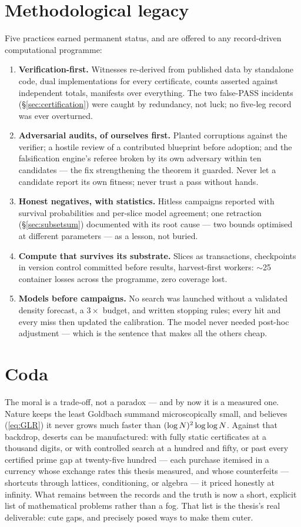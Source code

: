 \section{Methodological legacy}\label{sec:method}

Five practices earned permanent status, and are offered to any
record-driven computational programme:

\begin{enumerate}
\item \textbf{Verification-first.} Witnesses re-derived from published
data by standalone code, dual implementations for every certificate,
counts asserted against independent totals, manifests over everything.
The two false-PASS incidents (\S\ref{sec:certification}) were caught
by redundancy, not luck; no five-leg record was ever overturned.
\item \textbf{Adversarial audits, of ourselves first.} Planted
corruptions against the verifier; a hostile review of a contributed
blueprint before adoption; and the falsification engine's referee
broken by its own adversary within ten candidates --- the fix
strengthening the theorem it guarded. Never let a candidate report its
own fitness; never trust a pass without hands.
\item \textbf{Honest negatives, with statistics.} Hitless campaigns
reported with survival probabilities and per-slice model agreement;
one retraction (\S\ref{sec:subsetsum}) documented with its root cause
--- two bounds optimised at different parameters --- as a lesson, not
buried.
\item \textbf{Compute that survives its substrate.} Slices as
transactions, checkpoints in version control committed before results,
harvest-first workers: $\sim$25 container losses across the programme,
zero coverage lost.
\item \textbf{Models before campaigns.} No search was launched without
a validated density forecast, a $3\times$ budget, and written stopping
rules; every hit and every miss then updated the calibration. The
model never needed post-hoc adjustment --- which is the sentence that
makes all the others cheap.
\end{enumerate}

\section{Coda}\label{sec:coda}

The moral is a trade-off, not a paradox --- and by now it is a measured
one. Nature keeps the least Goldbach summand microscopically small, and
believes (\ref{eq:GLR}) it never grows much faster than
$(\log N)^2\log\log N$. Against that backdrop, deserts can be
manufactured: with fully static certificates at a thousand digits, or
with controlled search at a hundred and fifty, or past every certified
prime gap at twenty-five hundred --- each purchase itemised in a
currency whose exchange rates this thesis measured, and whose
counterfeits --- shortcuts through lattices, conditioning, or algebra
--- it priced honestly at infinity. What remains between the records
and the truth is now a short, explicit list of mathematical problems
rather than a fog. That list is the thesis's real deliverable: cute
gaps, and precisely posed ways to make them cuter.
